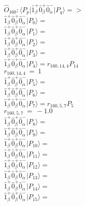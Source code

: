 \documentclass[14pt]{article}
\begin{document}
    $\hat{O}_{160}:  \langle{P_p}\vert \hat{1}_{\beta}^{+}\hat{0}_{\beta}^{+}\hat{0}_{\alpha}^{-} \vert{P_q}\rangle => $ \\ 
    $ \hat{1}_{\beta}^{+}\hat{0}_{\beta}^{+}\hat{0}_{\alpha}^{-} \vert{P_{0}}\rangle =  $ \\ 
    $ \hat{1}_{\beta}^{+}\hat{0}_{\beta}^{+}\hat{0}_{\alpha}^{-} \vert{P_{1}}\rangle =  $ \\ 
    $ \hat{1}_{\beta}^{+}\hat{0}_{\beta}^{+}\hat{0}_{\alpha}^{-} \vert{P_{2}}\rangle =  $ \\ 
    $ \hat{1}_{\beta}^{+}\hat{0}_{\beta}^{+}\hat{0}_{\alpha}^{-} \vert{P_{3}}\rangle =  $ \\ 
    $ \hat{1}_{\beta}^{+}\hat{0}_{\beta}^{+}\hat{0}_{\alpha}^{-} \vert{P_{4}}\rangle = {r}_{160,14,4}P_{14} $ \\ 
    ${r}_{160,14,4}\ =\ 1 $ \\ 
    $ \hat{1}_{\beta}^{+}\hat{0}_{\beta}^{+}\hat{0}_{\alpha}^{-} \vert{P_{5}}\rangle =  $ \\ 
    $ \hat{1}_{\beta}^{+}\hat{0}_{\beta}^{+}\hat{0}_{\alpha}^{-} \vert{P_{6}}\rangle =  $ \\ 
    $ \hat{1}_{\beta}^{+}\hat{0}_{\beta}^{+}\hat{0}_{\alpha}^{-} \vert{P_{7}}\rangle = {r}_{160,5,7}P_{5} $ \\ 
    ${r}_{160,5,7}\ =\ -1.0 $ \\ 
    $ \hat{1}_{\beta}^{+}\hat{0}_{\beta}^{+}\hat{0}_{\alpha}^{-} \vert{P_{8}}\rangle =  $ \\ 
    $ \hat{1}_{\beta}^{+}\hat{0}_{\beta}^{+}\hat{0}_{\alpha}^{-} \vert{P_{9}}\rangle =  $ \\ 
    $ \hat{1}_{\beta}^{+}\hat{0}_{\beta}^{+}\hat{0}_{\alpha}^{-} \vert{P_{10}}\rangle =  $ \\ 
    $ \hat{1}_{\beta}^{+}\hat{0}_{\beta}^{+}\hat{0}_{\alpha}^{-} \vert{P_{11}}\rangle =  $ \\ 
    $ \hat{1}_{\beta}^{+}\hat{0}_{\beta}^{+}\hat{0}_{\alpha}^{-} \vert{P_{12}}\rangle =  $ \\ 
    $ \hat{1}_{\beta}^{+}\hat{0}_{\beta}^{+}\hat{0}_{\alpha}^{-} \vert{P_{13}}\rangle =  $ \\ 
    $ \hat{1}_{\beta}^{+}\hat{0}_{\beta}^{+}\hat{0}_{\alpha}^{-} \vert{P_{14}}\rangle =  $ \\ 
    $ \hat{1}_{\beta}^{+}\hat{0}_{\beta}^{+}\hat{0}_{\alpha}^{-} \vert{P_{15}}\rangle =  $ \\ 
    
\end{document}
